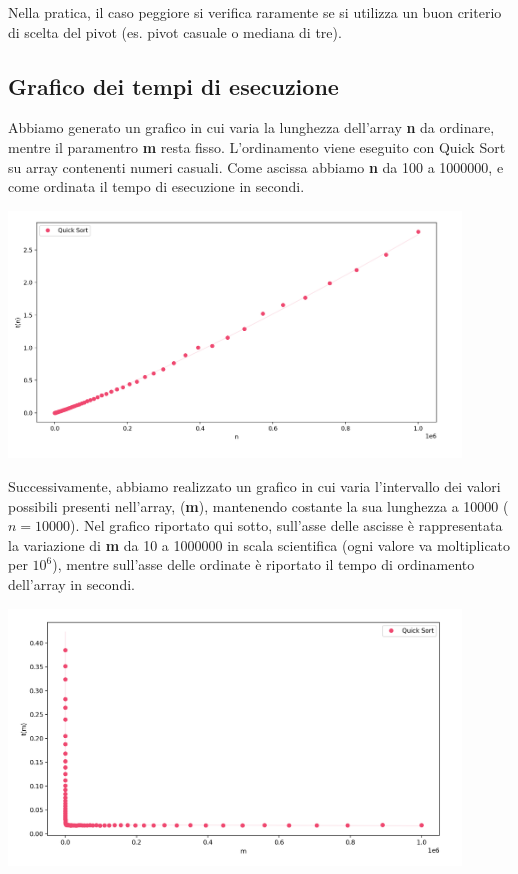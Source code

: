 \documentclass[a4paper, 12pt, oneside]{book}
\begin{document}
\noindent Nella pratica, il caso peggiore si verifica raramente se si utilizza un buon criterio di scelta del pivot (es. pivot casuale o mediana di tre).

\subsection*{Grafico dei tempi di esecuzione}

Abbiamo generato un grafico in cui varia la lunghezza dell'array \textbf{n} da ordinare, mentre il paramentro \textbf{m} resta fisso. L'ordinamento viene eseguito con Quick Sort su array contenenti numeri casuali. Come ascissa abbiamo \textbf{n} da 100 a 1000000, e come ordinata il tempo di esecuzione in secondi.

\begin{center}
	\includegraphics[width=0.9\textwidth]{images/grafico_quick_sort_n.png}
\end{center}

\noindent Successivamente, abbiamo realizzato un grafico in cui varia l'intervallo dei valori possibili presenti nell'array, (\textbf{m}), mantenendo costante la sua lunghezza a 10000 (\(n=10000\)). Nel grafico riportato qui sotto, sull'asse delle ascisse è rappresentata la variazione di \textbf{m} da 10 a 1000000 in scala scientifica (ogni valore va moltiplicato per \(10^6\)), mentre sull'asse delle ordinate è riportato il tempo di ordinamento dell'array in secondi.
 
\begin{center}
	\includegraphics[width=0.9\textwidth]{images/grafico_quick_sort_m.png}
\end{center}
\end{document}
